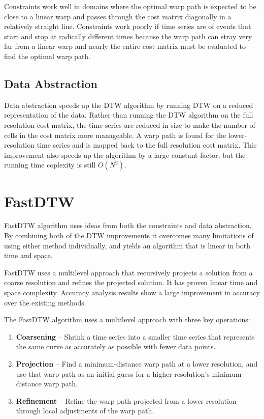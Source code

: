 Constraints work well in domains where the optimal warp path is expected to be close to a linear
warp and passes through the cost matrix diagonally in a relatively straight line. Constraints work
poorly if time series are of events that start and stop at radically different times because the
warp path can stray very far from a linear warp and nearly the entire cost matrix must be evaluated
to find the optimal warp path. \cite{toward_accurate__dtw}

\subsection{Data Abstraction}

Data abstraction speeds up the DTW algorithm by running DTW on a reduced representation of the data.
Rather than running the DTW algorithm on the full resolution cost matrix, the time series are
reduced in size to make the number of cells in the cost matrix more manageable. A warp path is found
for the lower-resolution time series and is mapped back to the full resolution cost matrix. This
improvement also speeds up the algorithm by a large constant factor, but the running time coplexity
is still $O(N^2)$.

\section{FastDTW}

FastDTW algorithm uses ideas from both the constraints and data abstraction. By combining both of
the DTW improvements it overcomes many limitations of using either method individually, and yields
an algorithm that is linear in both time and space. 

FastDTW uses a multilevel approach that
recursively projects a solution from a coarse resolution and refines the projected solution. It has
proven linear time and space complexity. Accuracy analysis results show a large improvement in
accuracy over the existing methods. \cite{toward_accurate__dtw}

The FastDTW algorithm uses a multilevel approach with three key operations:
\begin{enumerate}
  \item \textbf{Coarsening} – Shrink a time series into a smaller time series that represents the
  same curve as accurately as possible with fewer data points.
  \item \textbf{Projection} – Find a minimum-distance warp path at a lower resolution, and use that
  warp path as an initial guess for a higher resolution’s minimum-distance warp path.
  \item \textbf{Refinement} – Refine the warp path projected from a lower resolution through local
  adjustments of the warp path.
\end{enumerate}

